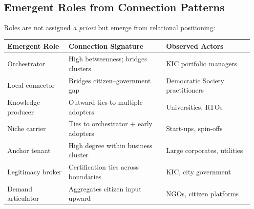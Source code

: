 \documentclass[../main.tex]{subfiles}
\begin{document}
\subsection{Emergent Roles from Connection Patterns}

Roles are not assigned \textit{a priori} but emerge from relational positioning:

\tablestriped
\small
\begin{center}
\begin{tabular}{@{}p{2.5cm}p{4.2cm}p{4.8cm}@{}}
\toprule
\textbf{Emergent Role} & \textbf{Connection Signature} & \textbf{Observed Actors} \\
\midrule
Orchestrator & High betweenness; bridges clusters & KIC portfolio managers \\
Local connector & Bridges citizen--government gap & Democratic Society practitioners \\
Knowledge producer & Outward ties to multiple adopters & Universities, RTOs \\
Niche carrier & Ties to orchestrator + early adopters & Start-ups, spin-offs \\
Anchor tenant & High degree within business cluster & Large corporates, utilities \\
Legitimacy broker & Certification ties across boundaries & KIC, city government \\
Demand articulator & Aggregates citizen input upward & NGOs, citizen platforms \\
\bottomrule
\end{tabular}
\label{tab:emergent-roles}
\end{center}
\normalsize
\end{document}
